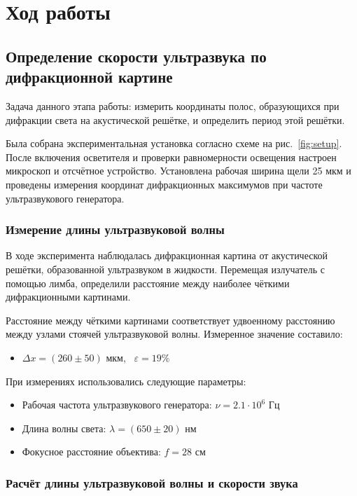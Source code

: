 \newpage

\section{Ход работы}

\subsection{Определение скорости ультразвука по дифракционной картине}

Задача данного этапа работы: измерить координаты полос, образующихся при дифракции света на акустической решётке, и определить период этой решётки.

Была собрана экспериментальная установка согласно схеме на рис.~\ref{fig:setup}. После включения осветителя и проверки равномерности освещения настроен микроскоп и отсчётное устройство. Установлена рабочая ширина щели 25 мкм и проведены измерения координат дифракционных максимумов при частоте ультразвукового генератора.

\subsubsection{Измерение длины ультразвуковой волны}

В ходе эксперимента наблюдалась дифракционная картина от акустической решётки, образованной ультразвуком в жидкости. Перемещая излучатель с помощью лимба, определили расстояние между наиболее чёткими дифракционными картинами.

Расстояние между чёткими картинами соответствует удвоенному расстоянию между узлами стоячей ультразвуковой волны. Измеренное значение составило:
\begin{itemize}
    \item $\Delta x = (260 \pm 50)$ мкм, \ $\varepsilon = 19\%$
\end{itemize}

При измерениях использовались следующие параметры:
\begin{itemize}
    \item Рабочая частота ультразвукового генератора: $\nu = 2.1 \cdot 10^6$ Гц
    \item Длина волны света: $\lambda = (650 \pm 20)$ нм
    \item Фокусное расстояние объектива: $f = 28$ см
\end{itemize}

\subsubsection{Расчёт длины ультразвуковой волны и скорости звука}

